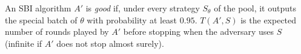 \begin{definition}
  \label{def:is_good}
  \leanok
  An SBI algorithm $A'$ is \emph{good} if, under every strategy $S_\theta$ of the pool, it outputs
  the special batch of $\theta$ with probability at least $0.95$. $T(A', S)$ is the expected number
  of rounds played by $A'$ before stopping when the adversary uses $S$ (infinite if $A'$ does not
  stop almost surely).
\end{definition}
